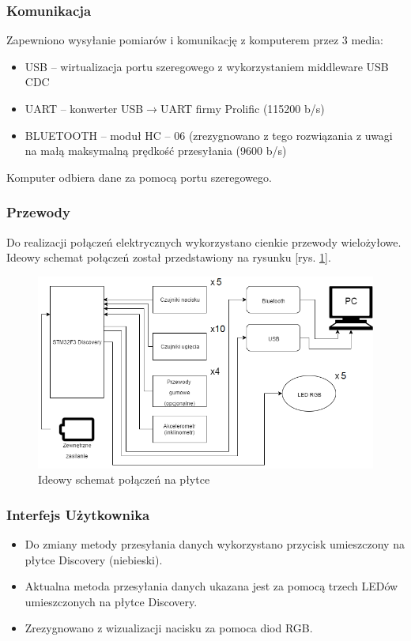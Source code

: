 \documentclass[12pt,a4paper]{article}
\begin{document}
\subsubsection{Komunikacja}
Zapewniono wysyłanie pomiarów i komunikację z komputerem przez 3 media:
\begin{itemize}
\item USB -- wirtualizacja portu szeregowego z wykorzystaniem middleware USB CDC
\item UART -- konwerter USB$\rightarrow$UART firmy Prolific (115200 b/s)
\item BLUETOOTH -- moduł HC -- 06 (zrezygnowano z tego rozwiązania z uwagi na małą maksymalną prędkość przesyłania (9600 b/s)
\end{itemize}
Komputer odbiera dane za pomocą portu szeregowego.

\subsubsection{Przewody}
Do realizacji połączeń elektrycznych wykorzystano cienkie przewody wielożyłowe. Ideowy schemat połączeń został przedstawiony na rysunku [rys. \ref{fig:kabelki}].
\begin{figure}[!htb]
\centering
\includegraphics[width=.6\textwidth]{./images/SchematIdeowy.png}
\caption{Ideowy schemat połączeń na płytce \label{fig:kabelki}}
\end{figure}

\subsubsection{Interfejs Użytkownika}
\begin{itemize}

\item Do zmiany metody przesyłania danych wykorzystano przycisk umieszczony na płytce Discovery (niebieski). 
\item Aktualna metoda przesyłania danych ukazana jest za pomocą trzech LEDów umieszczonych na płytce Discovery.
\item Zrezygnowano z wizualizacji nacisku za pomoca diod RGB.
\end{itemize}
\end{document}
